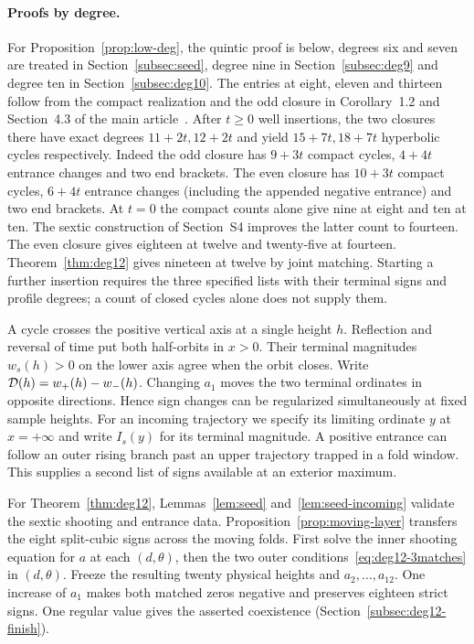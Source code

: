 \documentclass[11pt]{article}
\begin{document}
\paragraph{Proofs by degree.}
For Proposition~\ref{prop:low-deg}, the quintic proof is below,
degrees six and seven are treated in Section~\ref{subsec:seed},
degree nine in Section~\ref{subsec:deg9} and degree ten in
Section~\ref{subsec:deg10}. The entries at eight, eleven and
thirteen follow from the compact realization and the odd closure
in Corollary~1.2 and Section~4.3 of the main article~\cite{MainArticle}. After $t\ge0$ well insertions,
the two closures there have exact degrees $11+2t,12+2t$ and yield
$15+7t,18+7t$ hyperbolic cycles respectively. Indeed the odd closure
has $9+3t$ compact cycles, $4+4t$ entrance changes and two end
brackets. The even closure has $10+3t$ compact cycles, $6+4t$
entrance changes (including the appended negative entrance) and
two end brackets. At $t=0$ the compact counts alone give nine at
eight and ten at ten. The sextic construction of Section~S4 improves
the latter count to fourteen. The even closure gives eighteen at
twelve and twenty-five at fourteen. Theorem~\ref{thm:deg12} gives
nineteen at twelve by joint matching. Starting a further insertion
requires the three specified lists with their terminal signs and
profile degrees; a count of closed cycles alone does not supply them.

A cycle crosses the positive vertical axis at a single height $h$.
Reflection and reversal of time put both half-orbits in $x>0$.
Their terminal magnitudes $w_s(h)>0$ on the lower axis agree when the orbit
closes. Write $\mathcal{D}(h)=w_+(h)-w_-(h)$. Changing $a_1$ moves the two terminal
ordinates in opposite directions. Hence sign changes can be regularized
simultaneously at fixed sample heights. For an incoming trajectory we
specify its limiting ordinate $y$ at $x=+\infty$ and write $I_s(y)$ for
its terminal magnitude. A positive entrance can follow an outer rising
branch past an upper trajectory trapped in a fold window. This supplies a
second list of signs available at an exterior maximum.

For Theorem~\ref{thm:deg12}, Lemmas~\ref{lem:seed} and~\ref{lem:seed-incoming}
validate the sextic shooting and entrance data. Proposition~\ref{prop:moving-layer}
transfers the eight split-cubic signs across the moving folds. First solve
the inner shooting equation for $a$ at each $(d,\theta)$, then the two
outer conditions~\eqref{eq:deg12-3matches} in $(d,\theta)$. Freeze the
resulting twenty physical heights and $a_2,\ldots,a_{12}$. One increase
of $a_1$ makes both matched zeros negative and preserves eighteen strict
signs. One regular value gives the asserted coexistence
(Section~\ref{subsec:deg12-finish}).
\end{document}

